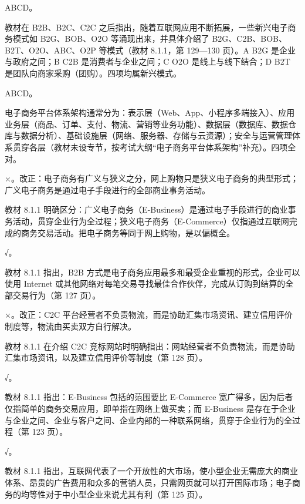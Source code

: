 \documentclass[a4paper,11pt]{article}
\begin{document}
\q ABCD。\begin{analysis}教材在 B2B、B2C、C2C 之后指出，随着互联网应用不断拓展，一些新兴电子商务模式如 B2G、BOB、O2O 等涌现出来，并具体介绍了 B2G、C2B、BOB、B2T、O2O、ABC、O2P 等模式（教材 8.1.1，第 129—130 页）。A B2G 是企业与政府之间；B C2B 是消费者与企业之间；C O2O 是线上与线下结合；D B2T 是团队向商家采购（团购）。四项均属新兴模式。\end{analysis}

\q ABCD。\begin{analysis}电子商务平台体系架构通常分为：表示层（Web、App、小程序多端接入）、应用业务层（商品、订单、支付、物流、营销等业务功能）、数据层（数据库、数据仓库与数据分析）、基础设施层（网络、服务器、存储与云资源）；安全与运营管理体系贯穿各层（教材未设专节，按考试大纲“电子商务平台体系架构”补充）。四项全对。\end{analysis}


\q ×。改正：电子商务有广义与狭义之分，网上购物只是狭义电子商务的典型形式；广义电子商务是通过电子手段进行的全部商业事务活动。\begin{analysis}教材 8.1.1 明确区分：广义电子商务（E-Business）是通过电子手段进行的商业事务活动，贯穿企业行为全过程；狭义电子商务（E-Commerce）仅指通过互联网完成的商务交易活动。把电子商务等同于网上购物，是以偏概全。\end{analysis}

\q √。\begin{analysis}教材 8.1.1 指出，B2B 方式是电子商务应用最多和最受企业重视的形式，企业可以使用 Internet 或其他网络对每笔交易寻找最佳合作伙伴，完成从订购到结算的全部交易行为（第 127 页）。\end{analysis}

\q ×。改正：C2C 平台经营者不负责物流，而是协助汇集市场资讯、建立信用评价制度等，物流由买卖双方自行解决。\begin{analysis}教材 8.1.1 在介绍 C2C 竞标网站时明确指出：网站经营者不负责物流，而是协助汇集市场资讯，以及建立信用评价等制度（第 128 页）。\end{analysis}

\q √。\begin{analysis}教材 8.1.1 指出：E-Business 包括的范围要比 E-Commerce 宽广得多，因为后者仅指简单的商务交易应用，即单指在网络上做买卖；而 E-Business 是存在于企业与企业之间、企业与客户之间、企业内部的一种联系网络，贯穿于企业行为的全过程（第 123 页）。\end{analysis}

\q √。\begin{analysis}教材 8.1.1 指出，互联网代表了一个开放性的大市场，使小型企业无需庞大的商业体系、昂贵的广告费用和众多的营销人员，只需网页就可以打开国际市场；电子商务的均等性对于中小型企业来说尤其有利（第 125 页）。\end{analysis}
\end{document}
